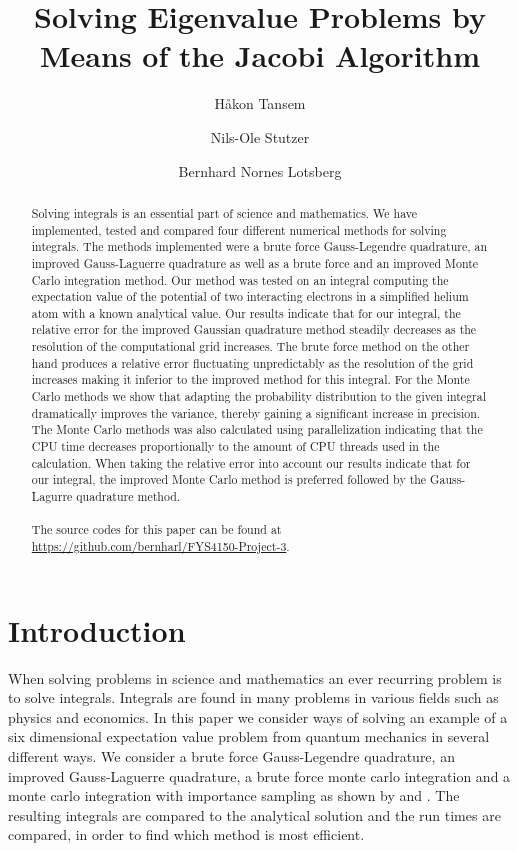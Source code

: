 \documentclass[10pt, twocolumn]{aastex62}
\begin{document}
\title{Solving Eigenvalue Problems by Means of the Jacobi Algorithm}

\author{Håkon Tansem}

\author{Nils-Ole Stutzer}

\author{Bernhard Nornes Lotsberg}

\begin{abstract}
	Solving integrals is an essential part of science and mathematics. We have
	implemented, tested and compared four different numerical methods for
	solving integrals. The methods implemented were a brute force
	Gauss-Legendre quadrature, an improved Gauss-Laguerre quadrature as well as
	a brute force and an improved Monte Carlo integration method. Our method was
	tested on an integral computing the expectation value of the potential of
	two interacting electrons in a simplified helium atom with a known
	analytical value. Our results indicate that for our integral, the relative error for the improved Gaussian
	quadrature method steadily decreases as the resolution of the computational
	grid increases. The brute force method on the other hand produces a relative
	error fluctuating unpredictably as the resolution of the grid increases
	making it inferior to the improved method for this integral. For the Monte
	Carlo methods we show that adapting the probability distribution to the
	given integral dramatically improves the variance, thereby gaining a
	significant increase in precision. The Monte Carlo methods was also
	calculated using parallelization indicating that the CPU time decreases
	proportionally to the amount of CPU threads used in the calculation. When
	taking the relative error into account our results indicate that for our
	integral, the improved Monte Carlo method is preferred followed by the
	Gauss-Lagurre quadrature method. \\\\
	The source codes for this paper can be found at
	\href{https://github.com/bernharl/FYS4150-Project-3}{https://github.com/bernharl/FYS4150-Project-3}.  
	 
\end{abstract}

\section{Introduction} \label{sec:intro}
When solving problems in science and mathematics an ever recurring problem is to
solve integrals. Integrals are found in many problems in various fields such as
physics and economics. In this paper we consider ways of solving an example
of a six dimensional expectation value problem from quantum mechanics
in several different ways. We consider a brute force Gauss-Legendre quadrature,
an improved Gauss-Laguerre quadrature, a brute force monte carlo integration and
a monte carlo integration with importance sampling as shown by \cite{press:2007}
and \cite{jensen:2015}. The resulting integrals are compared to the
analytical solution and the run times are compared, in order to find which
method is most efficient.
\end{document}
